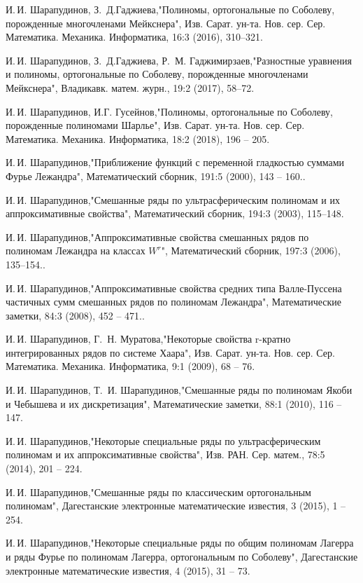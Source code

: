 \begin{thebibliography}{20}
И.\,И. Шарапудинов, З.\, Д.Гаджиева,"Полиномы, ортогональные по Соболеву, порожденные многочленами Мейкснера", Изв. Сарат. ун-та. Нов. сер. Сер. Математика. Механика. Информатика, 16:3 (2016), 310--321.


И.\,И. Шарапудинов, З.\, Д.Гаджиева, Р.\, М. Гаджимирзаев,"Разностные уравнения и полиномы, ортогональные по Соболеву, порожденные многочленами Мейкснера", Владикавк. матем. журн., 19:2 (2017), 58--72.


И.\,И. Шарапудинов, И.Г. Гусейнов,"Полиномы, ортогональные по Соболеву, порожденные полиномами Шарлье", Изв. Сарат. ун-та. Нов. сер. Сер. Математика. Механика. Информатика, 18:2 (2018), 196 -- 205.


И.\,И. Шарапудинов,"Приближение функций с переменной гладкостью суммами Фурье Лежандра", Математический сборник, 191:5 (2000), 143 -- 160..


И.\,И. Шарапудинов,"Смешанные ряды по ультрасферическим полиномам и их аппроксимативные свойства", Математический сборник, 194:3 (2003), 115--148.


И.\,И. Шарапудинов,"Аппроксимативные свойства смешанных рядов по полиномам Лежандра на классах $W^r$", Математический сборник, 197:3 (2006), 135–154..


И.\,И. Шарапудинов,"Аппроксимативные свойства средних типа Валле-Пуссена частичных сумм смешанных рядов по полиномам Лежандра", Математические заметки, 84:3 (2008), 452 -- 471..


И.\,И. Шарапудинов,  Г.\, Н. Муратова,"Некоторые свойства r-кратно интегрированных рядов по системе Хаара", Изв. Сарат. ун-та. Нов. сер. Сер. Математика. Механика. Информатика, 9:1 (2009), 68 -- 76.


И.\,И. Шарапудинов, Т.\, И. Шарапудинов,"Смешанные ряды по полиномам Якоби и Чебышева и их дискретизация", Математические заметки, 88:1 (2010), 116 -- 147.


И.\,И. Шарапудинов,"Некоторые специальные ряды по ультрасферическим полиномам и их аппроксимативные свойства", Изв. РАН. Сер. матем., 78:5 (2014), 201 -- 224.


И.\,И. Шарапудинов,"Смешанные ряды по классическим ортогональным полиномам", Дагестанские электронные математические известия, 3 (2015), 1 -- 254.


И.\,И. Шарапудинов,"Некоторые специальные ряды по общим полиномам Лагерра и ряды Фурье по полиномам Лагерра, ортогональным по Соболеву", Дагестанские электронные математические известия, 4 (2015), 31 -- 73.



\end{thebibliography}
